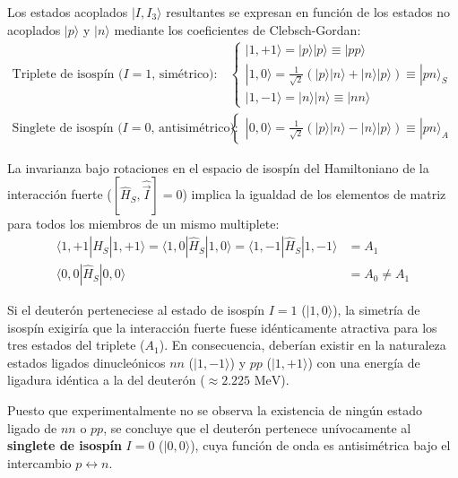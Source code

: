 Los estados acoplados $|I, I_3\rangle$ resultantes se expresan en función de los estados no acoplados $|p\rangle$ y $|n\rangle$ mediante los coeficientes de Clebsch-Gordan:
\begin{align}
    \text{Triplete de isospín ($I=1$, simétrico):} \quad & \begin{cases}
        |1, +1\rangle = |p\rangle |p\rangle \equiv |pp\rangle \\
        |1, 0\rangle = \frac{1}{\sqrt{2}} \left( |p\rangle |n\rangle + |n\rangle |p\rangle \right) \equiv |pn\rangle_S \\
        |1, -1\rangle = |n\rangle |n\rangle \equiv |nn\rangle
    \end{cases} \\
    \text{Singlete de isospín ($I=0$, antisimétrico):} \quad & \begin{cases}
        |0, 0\rangle = \frac{1}{\sqrt{2}} \left( |p\rangle |n\rangle - |n\rangle |p\rangle \right) \equiv |pn\rangle_A
    \end{cases}
\end{align}

La invarianza bajo rotaciones en el espacio de isospín del Hamiltoniano de la interacción fuerte ($[\hat{H}_S, \hat{\vec{I}}] = 0$) implica la igualdad de los elementos de matriz para todos los miembros de un mismo multiplete:
\begin{align}
    \langle 1, +1 | \hat{H}_S | 1, +1 \rangle = \langle 1, 0 | \hat{H}_S | 1, 0 \rangle = \langle 1, -1 | \hat{H}_S | 1, -1 \rangle &= A_1 \\
    \langle 0, 0 | \hat{H}_S | 0, 0 \rangle &= A_0 \neq A_1
\end{align}

\begin{observacion}[Deducción del isospín $I=0$ para el deuterón]
Si el deuterón perteneciese al estado de isospín $I=1$ ($|1, 0\rangle$), la simetría de isospín exigiría que la interacción fuerte fuese idénticamente atractiva para los tres estados del triplete ($A_1$). En consecuencia, deberían existir en la naturaleza estados ligados dinucleónicos $nn$ ($|1,-1\rangle$) y $pp$ ($|1,+1\rangle$) con una energía de ligadura idéntica a la del deuterón ($\approx 2.225\text{ MeV}$). 

Puesto que experimentalmente no se observa la existencia de ningún estado ligado de $nn$ o $pp$, se concluye que el deuterón pertenece unívocamente al \textbf{singlete de isospín} $I=0$ ($|0,0\rangle$), cuya función de onda es antisimétrica bajo el intercambio $p \leftrightarrow n$.
\end{observacion}

